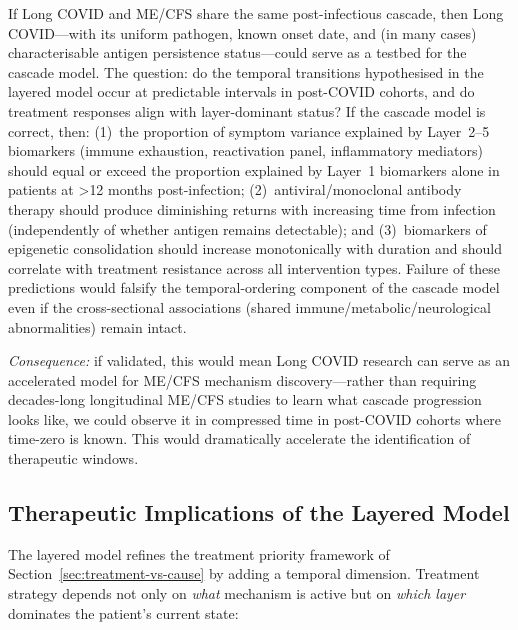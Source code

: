 \begin{open_question}
\label{oq:lc-mecfs-window}
If Long COVID and ME/CFS share the same post-infectious cascade, then Long COVID---with its uniform pathogen, known onset date, and (in many cases) characterisable antigen persistence status---could serve as a testbed for the cascade model. The question: do the temporal transitions hypothesised in the layered model occur at predictable intervals in post-COVID cohorts, and do treatment responses align with layer-dominant status? If the cascade model is correct, then: (1)~the proportion of symptom variance explained by Layer~2--5 biomarkers (immune exhaustion, reactivation panel, inflammatory mediators) should equal or exceed the proportion explained by Layer~1 biomarkers alone in patients at {\textgreater}12 months post-infection; (2)~antiviral/monoclonal antibody therapy should produce diminishing returns with increasing time from infection (independently of whether antigen remains detectable); and (3)~biomarkers of epigenetic consolidation should increase monotonically with duration and should correlate with treatment resistance across all intervention types. Failure of these predictions would falsify the temporal-ordering component of the cascade model even if the cross-sectional associations (shared immune/metabolic/neurological abnormalities) remain intact.

\textit{Consequence:} if validated, this would mean Long COVID research can serve as an accelerated model for ME/CFS mechanism discovery---rather than requiring decades-long longitudinal ME/CFS studies to learn what cascade progression looks like, we could observe it in compressed time in post-COVID cohorts where time-zero is known. This would dramatically accelerate the identification of therapeutic windows.
\end{open_question}

\subsection{Therapeutic Implications of the Layered Model}

The layered model refines the treatment priority framework of Section~\ref{sec:treatment-vs-cause} by adding a temporal dimension. Treatment strategy depends not only on \emph{what} mechanism is active but on \emph{which layer} dominates the patient's current state:

